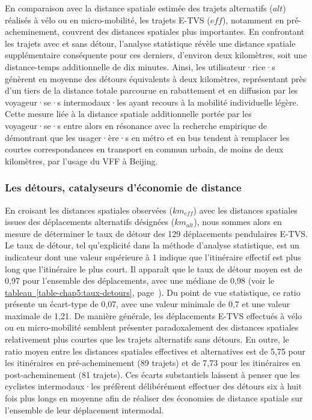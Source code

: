 \begin{refsegment}
En comparaison avec la distance spatiale estimée des trajets alternatifs (\(alt\)) réalisés à vélo ou en micro-mobilité, les trajets \acrshort{E-TVS} (\(eff\)), notamment en pré-acheminement, couvrent des distances spatiales plus importantes. En confrontant les trajets avec et sans détour, l'analyse statistique révèle une distance spatiale supplémentaire conséquente pour ces derniers, d'environ deux kilomètres, soit une distance-temps additionnelle de dix minutes. Ainsi, les utilisateur·rice·s génèrent en moyenne des détours équivalents à deux kilomètres, représentant près d'un tiers de la distance totale parcourue en rabattement et en diffusion par les voyageur·se·s intermodaux·les ayant recours à la mobilité individuelle légère. Cette mesure liée à la distance spatiale additionnelle portée par les voyageur·se·s entre alors en résonance avec la recherche empirique de \textcolor{blue}{\textcite[11]{jin_competition_2019}} démontrant que les usager·ère·s en métro et en bus tendent à remplacer les courtes correspondances en transport en commun urbain, de moins de deux kilomètres, par l'usage du \acrshort{VFF} à Beijing.%

\subsubsection*{Les détours, catalyseurs d'économie de distance
    \label{chap5:detours-gains-de-temps}
    }

En croisant les distances spatiales observées (\(km_{eff}\)) avec les distances spatiales issues des déplacements alternatifs désignées (\(km_{alt}\)), nous sommes alors en mesure de déterminer le taux de détour des 129 déplacements pendulaires \acrshort{E-TVS}. Le taux de détour, tel qu'explicité dans la méthode d'analyse statistique, est un indicateur dont une valeur supérieure à 1 indique que l'itinéraire effectif est plus long que l'itinéraire le plus court. Il apparaît que le taux de détour moyen est de 0,97 pour l'ensemble des déplacements, avec une médiane de 0,98 (voir le \hyperref[table-chap5:taux-detours]{tableau~\ref{table-chap5:taux-detours}}, page~\pageref{table-chap5:taux-detours}). Du point de vue statistique, ce ratio présente un écart-type de 0,07, avec une valeur minimale de 0,7 et une valeur maximale de 1,21. De manière générale, les déplacements \acrshort{E-TVS} effectués à vélo ou en micro-mobilité semblent présenter paradoxalement des distances spatiales relativement plus courtes que les trajets alternatifs sans détours. En outre, le ratio moyen entre les distances spatiales effectives et alternatives est de 5,75 pour les itinéraires en pré-acheminement (89 trajets) et de 7,73 pour les itinéraires en post-acheminement (81 trajets). Ces écarts substantiels laissent à penser que les cyclistes intermodaux·les préfèrent délibérément effectuer des détours six à huit fois plus longs en moyenne afin de réaliser des économies de distance spatiale sur l'ensemble de leur déplacement intermodal.%


\end{refsegment}
